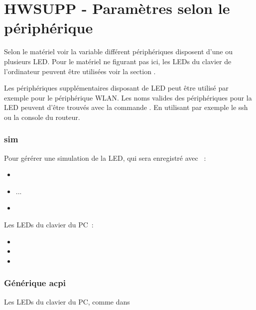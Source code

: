 \section{HWSUPP - Paramètres selon le périphérique}

Selon le matériel voir la variable  différent périphériques
disposent d'une ou plusieurs LED. Pour le matériel ne figurant pas ici, les LEDs du
clavier de l'ordinateur peuvent être utilisées voir la section
.

Les périphériques supplémentaires disposant de LED peut être utilisé par exemple
pour le périphérique WLAN. Les noms valides des périphériques pour la LED peuvent
d'être trouvés avec la commande . En utilisant par exemple
le ssh ou la console du routeur.

\subsubsection{sim}
 Pour gérérer une simulation de la LED, qui sera enregistré avec ~:
\begin{itemize}
  \item {}
  \item ...
  \item {}
\end{itemize}

Les LEDs du clavier du PC~:
\begin{itemize}
  \item {}
  \item {}
  \item {}
\end{itemize}

\subsubsection{Générique acpi}
Les LEDs du clavier du PC, comme dans 

